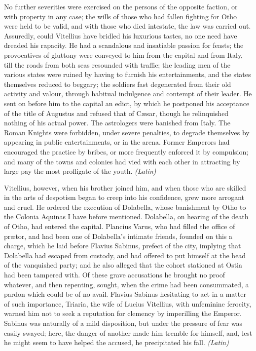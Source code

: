 No further severities were exercised on the persons of the opposite faction, or with property in any case; the wills of those who had fallen fighting for Otho were held to be valid, and with those who died intestate, the law was carried out. Assuredly, could Vitellius have bridled his luxurious tastes, no one need have dreaded his rapacity. He had a scandalous and insatiable passion for feasts; the provocatives of gluttony were conveyed to him from the capital and from Italy, till the roads from both seas resounded with traffic; the leading men of the various states were ruined by having to furnish his entertainments, and the states themselves reduced to beggary; the soldiers fast degenerated from their old activity and valour, through habitual indulgence and contempt of their leader. He sent on before him to the capital an edict, by which he postponed his acceptance of the title of Augustus and refused that of Cæsar, though he relinquished nothing of his actual power. The astrologers were banished from Italy. The Roman Knights were forbidden, under severe penalties, to degrade themselves by appearing in public entertainments, or in the arena. Former Emperors had encouraged the practice by bribes, or more frequently enforced it by compulsion; and many of the towns and colonies had vied with each other in attracting by large pay the most profligate of the youth. \emph{(Latin)}


Vitellius, however, when his brother joined him, and when those who are skilled in the arts of despotism began to creep into his confidence, grew more arrogant and cruel. He ordered the execution of Dolabella, whose banishment by Otho to the Colonia Aquinas I have before mentioned. Dolabella, on hearing of the death of Otho, had entered the capital. Plancius Varus, who had filled the office of prætor, and had been one of Dolabella's intimate friends, founded on this a charge, which he laid before Flavius Sabinus, prefect of the city, implying that Dolabella had escaped from custody, and had offered to put himself at the head of the vanquished party; and he also alleged that the cohort stationed at Ostia had been tampered with. Of these grave accusations he brought no proof whatever, and then repenting, sought, when the crime had been consummated, a pardon which could be of no avail. Flavius Sabinus hesitating to act in a matter of such importance, Triaria, the wife of Lucius Vitellius, with unfeminine ferocity, warned him not to seek a reputation for clemency by imperilling the Emperor. Sabinus was naturally of a mild disposition, but under the pressure of fear was easily swayed; here, the danger of another made him tremble for himself, and, lest he might seem to have helped the accused, he precipitated his fall. \emph{(Latin)}

